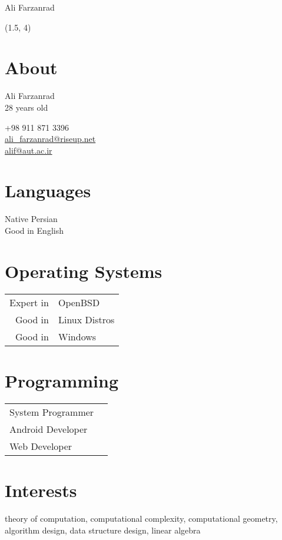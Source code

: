 \documentclass[a4paper,10pt]{article}
\begin{document}
{\Huge Ali Farzanrad}

\begin{textblock}{3.8}(1.5, 4)
	\raggedleft
	\section*{About}

	Ali Farzanrad \\
	28 years old

	+98 911 871 3396 \\
	\href{mailto:ali_farzanrad@riseup.net}{ali\_farzanrad@riseup.net} \\
	\href{mailto:alif@aut.ac.ir}{alif@aut.ac.ir}

	\section*{Languages}

	Native Persian \\
	Good in English

	\section*{Operating Systems}

	\begin{tabular}{rl}
		Expert in & OpenBSD \\
		Good in & Linux Distros \\
		Good in & Windows
	\end{tabular}

	\section*{Programming}

	\begin{tabular}{ll}
		System Programmer \\
		Android Developer \\
		Web Developer
	\end{tabular}

\end{textblock}

\section*{{\color{blue}I}nterests}

theory of computation, computational complexity, computational
geometry, algorithm design, data structure design, linear algebra
\end{document}
